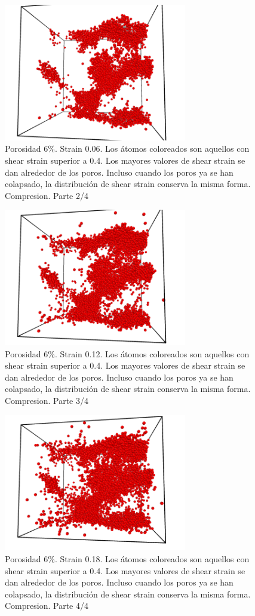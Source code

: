 \documentclass[10pt, oneside]{article} %
\begin{document}
\begin{figure}[H]
\centering
\includegraphics[width=8cm]{Figures/porosidad_6_shearstrain04_006.png}
\caption{Porosidad 6\%. Strain 0.06. Los átomos coloreados son aquellos con shear strain superior a 0.4. Los mayores valores de shear strain se dan alrededor de los poros. Incluso cuando los poros ya se han colapsado, la distribución de shear strain conserva la misma forma. Compresion. Parte 2/4}
\end{figure}

\begin{figure}[H]
\centering
\includegraphics[width=8cm]{Figures/porosidad_6_shearstrain04_012.png}
\caption{Porosidad 6\%. Strain 0.12. Los átomos coloreados son aquellos con shear strain superior a 0.4. Los mayores valores de shear strain se dan alrededor de los poros. Incluso cuando los poros ya se han colapsado, la distribución de shear strain conserva la misma forma. Compresion. Parte 3/4}
\end{figure}

\begin{figure}[H]
\centering
\includegraphics[width=8cm]{Figures/porosidad_6_shearstrain04_018.png}
\caption{Porosidad 6\%. Strain 0.18. Los átomos coloreados son aquellos con shear strain superior a 0.4. Los mayores valores de shear strain se dan alrededor de los poros. Incluso cuando los poros ya se han colapsado, la distribución de shear strain conserva la misma forma. Compresion. Parte 4/4}
\end{figure}
\end{document}
